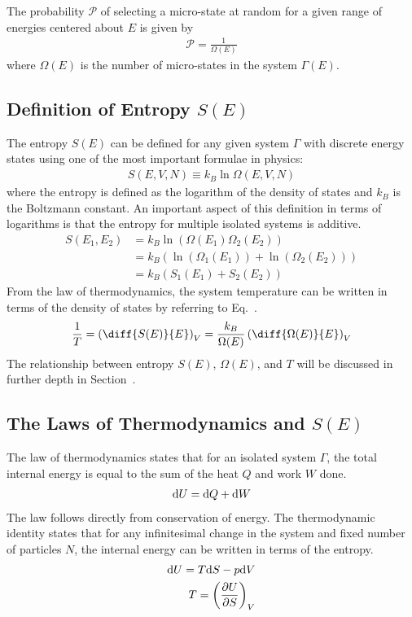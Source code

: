 The probability $\mathcal{P}$ of selecting a micro-state at random for a given range of energies centered about $E$ is given by
\begin{align}
    \mathcal{P} = \frac{1}{\Omega(E)}
\end{align}
where $\Omega(E)$ is the number of micro-states in the system $\Gamma(E)$.

\subsection{Definition of Entropy $S(E)$}\label{entropy}
The entropy $S(E)$ can be defined for any given system $\Gamma$ with discrete energy states using one of the most important formulae in physics:
\begin{align}\label{sdos}
    S(E,V,N) \equiv k_B \ln\Omega(E,V,N)
\end{align}
where the entropy is defined as the logarithm of the density of states and $k_B$ is the Boltzmann constant. An important aspect of this definition in terms of logarithms is that the entropy for multiple isolated systems is additive.
\begin{align}
    S(E_1,E_2) &= k_B \ln(\Omega(E_1)\Omega_2(E_2)) \\
    &= k_B \left( \ln(\Omega_1(E_1)) + \ln(\Omega_2(E_2))\right) \\
    &= k_B \left( S_1(E_1) + S_2(E_2)\right)
\end{align}
From the  law of thermodynamics, the system temperature can be written in terms of the density of states by referring to Eq.~.
\begin{align}
    \frac{1}{T} = \left(\diff{S(E)}{E}\right)_V = \frac{k_B}{\Omega(E)}\left(\diff{\Omega(E)}{E}\right)_V
\end{align}
The relationship between entropy $S(E)$, $\Omega(E)$, and $T$ will be discussed in further depth in Section~.

\subsection{The Laws of Thermodynamics and $S(E)$}\label{laws}
The  law of thermodynamics states that for an isolated system $\Gamma$, the total internal energy is equal to the sum of the heat $Q$ and work $W$ done.
\begin{align}
    \text{d}U = \text{d}Q + \text{d}W
\end{align}
The  law follows directly from conservation of energy. The thermodynamic identity states that for any infinitesimal change in the system and fixed number of particles $N$, the internal energy can be written in terms of the entropy.
\begin{align}
    \text{d}U =  T\text{d}S - p\text{d}V \\
    T = \left(\pdv{U}{S}\right)_V
\end{align}

